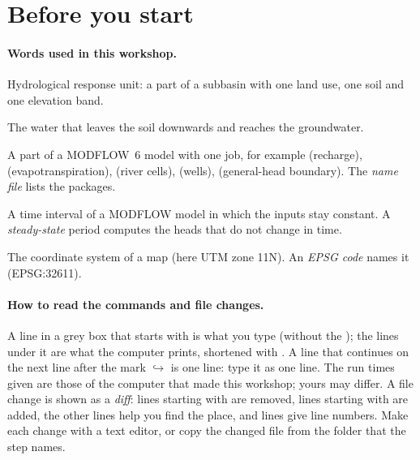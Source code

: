 \section{Before you start}
\paragraph{Words used in this workshop.}
\begin{description}[itemsep=1pt]
\item[HRU] Hydrological response unit: a part of a subbasin with one land use, one soil and one elevation band.
\item[Recharge] The water that leaves the soil downwards and reaches the groundwater.
\item[Package] A part of a MODFLOW~6 model with one job, for example  (recharge),  (evapotranspiration),
   (river cells),  (wells),  (general-head boundary). The \emph{name file} lists the packages.
\item[Stress period] A time interval of a MODFLOW model in which the inputs stay constant. A \emph{steady-state} period
  computes the heads that do not change in time.
\item[Projection] The coordinate system of a map (here UTM zone 11N). An \emph{EPSG code} names it (EPSG:32611).
\end{description}

\paragraph{How to read the commands and file changes.} A line in a grey box that starts with \cmd{\$} is what you type
(without the \cmd{\$}); the lines under it are what the computer prints, shortened with . A line that continues on the next line after the mark $\hookrightarrow$ is one line: type it
as one line. The run times given are those of the computer that made this workshop; yours may differ. A file change is shown as
a \emph{diff}: lines starting with \cmd{-} are removed, lines starting with \cmd{+} are added, the other lines help you find
the place, and  lines give line numbers. Make each change with a text editor, or copy the changed file from the
folder that the step names.
